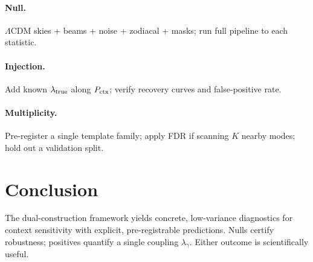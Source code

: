 \documentclass[11pt]{article}
\begin{document}
\paragraph{Null.} $\Lambda$CDM skies + beams + noise + zodiacal + masks; run full pipeline to each statistic.  
\paragraph{Injection.} Add known $\lambda_{\rm true}$ along $P_{\rm ctx}$; verify recovery curves and false-positive rate.  
\paragraph{Multiplicity.} Pre-register a single template family; apply FDR if scanning $K$ nearby modes; hold out a validation split.

\section{Conclusion}
The dual-construction framework yields concrete, low-variance diagnostics for context sensitivity with explicit, pre-registrable predictions. Nulls certify robustness; positives quantify a single coupling $\lambda_\gamma$. Either outcome is scientifically useful.
\end{document}
